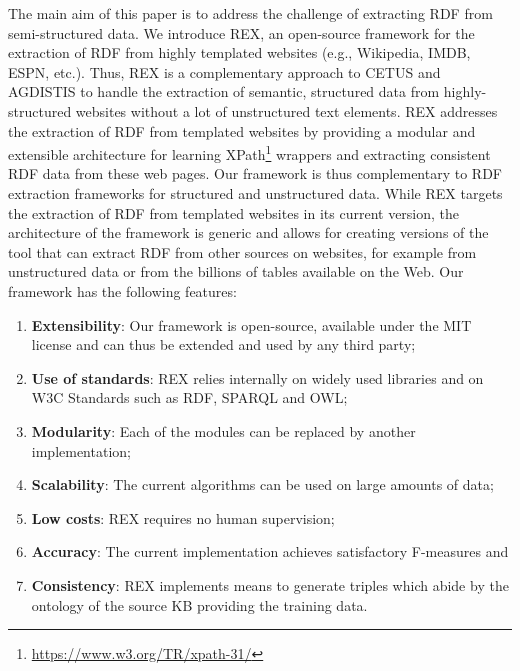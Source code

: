 The main aim of this paper is to address the challenge of extracting \ac{RDF} from semi-structured data.
We introduce REX, an open-source framework for the extraction of \ac{RDF} from highly templated websites (e.g., Wikipedia, IMDB, ESPN, etc.).
Thus, REX is a complementary approach to CETUS and AGDISTIS to handle the extraction of semantic, structured data  from highly-structured websites without a lot of unstructured text elements.
REX addresses the extraction of \ac{RDF} from templated websites by providing a modular and extensible architecture for learning XPath\footnote{\url{https://www.w3.org/TR/xpath-31/}} wrappers and extracting consistent \ac{RDF} data from these web pages.
Our framework is thus complementary to \ac{RDF} extraction frameworks for structured and unstructured data.
While REX targets the extraction of \ac{RDF} from templated websites in its current version, the architecture of the framework is generic and allows for creating versions of the tool that can extract \ac{RDF} from other sources on websites, for example from unstructured data or from the billions of tables available on the Web.
Our framework has the following features:
\begin{enumerate}
\item \textbf{Extensibility}: Our framework is open-source, available under the MIT license and can thus be extended and used by any third party;
\item \textbf{Use of standards}: REX relies internally on widely used libraries and on W3C Standards such as \ac{RDF}, SPARQL and OWL;
\item \textbf{Modularity}: Each of the modules can be replaced by another implementation;
\item \textbf{Scalability}: The current algorithms can be used on large amounts of data; 
\item \textbf{Low costs}: REX requires no human supervision; 
\item \textbf{Accuracy}: The current implementation achieves satisfactory F-measures and
\item \textbf{Consistency}: REX implements means to generate triples which abide by the ontology of the source  \ac{KB} providing the training data.
\end{enumerate}

